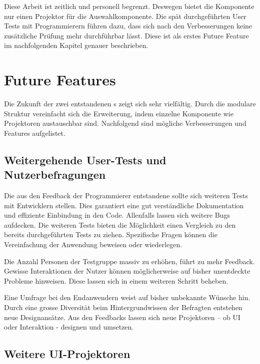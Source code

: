 Diese Arbeit ist zeitlich und personell begrenzt. 
Deswegen bietet die Komponente nur einen Projektor für die Auswahlkomponente. 
Die spät durchgeführten User Tests mit Programmierern führen dazu, dass sich nach den Verbesserungen keine zusätzliche Prüfung mehr durchführbar lässt. 
Diese ist als erstes Future Feature im nachfolgenden Kapitel genauer beschrieben. 


\section{Future Features}
\label{sec:future}

Die Zukunft der zwei entstandenen s zeigt sich sehr vielfältig. 
Durch die modulare Struktur vereinfacht sich die Erweiterung, indem einzelne Komponente wie Projektoren austauschbar sind. 
Nachfolgend sind mögliche Verbesserungen und Features aufgelistet. 


\subsection{Weitergehende User-Tests und Nutzerbefragungen}
\label{sec:moreUserTests}

Die aus den Feedback der Programmierer entstandene  sollte sich weiteren Tests mit Entwicklern stellen. 
Dies garantiert eine gut verständliche Dokumentation und effiziente Einbindung in den Code. 
Allenfalls lassen sich weitere Bugs aufdecken. 
Die weiteren Tests bieten die Möglichkeit einen Vergleich zu den bereits durchgeführten Tests zu ziehen. 
Spezifische Fragen können die Vereinfachung der Anwendung beweisen oder wiederlegen. 

Die Anzahl Personen der Testgruppe massiv zu erhöhen, führt zu mehr Feedback. 
Gewisse Interaktionen der Nutzer können möglicherweise auf bisher unentdeckte Probleme hinweisen. 
Diese lassen sich in einem weiteren Schritt beheben. 

Eine Umfrage bei den Endanwendern weist auf bisher unbekannte Wünsche hin. 
Durch eine grosse Diversität beim Hintergrundwissen der Befragten entstehen neue Designansätze. 
Aus den Feedbacks lassen sich neue Projektoren – ob UI oder Interaktion - designen und umsetzen. 


\subsection{Weitere UI-Projektoren}
\label{sec:moreUi}

